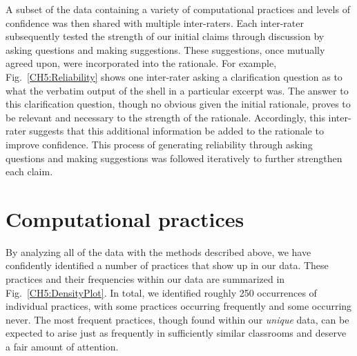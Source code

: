 \documentclass{msuphddissertation}
\begin{document}
\begin{doublespace}
A subset of the data containing a variety of computational practices and levels of confidence was then shared with multiple inter-raters.  Each inter-rater subsequently tested the strength of our initial claims through discussion by asking questions and making suggestions.  These suggestions, once mutually agreed upon, were incorporated into the rationale.  For example, Fig.~\ref{CH5:Reliability} shows one inter-rater asking a clarification question as to what the verbatim output of the shell in a particular excerpt was.  The answer to this clarification question, though no obvious given the initial rationale, proves to be relevant and necessary to the strength of the rationale.  Accordingly, this inter-rater suggests that this additional information be added to the rationale to improve confidence.  This process of generating reliability through asking questions and making suggestions was followed iteratively to further strengthen each claim.

\section{Computational practices}\label{CH5:Practices}

By analyzing all of the data with the methods described above, we have confidently identified a number of practices that show up in our data.  These practices and their frequencies within our data are summarized in Fig.~\ref{CH5:DensityPlot}.  In total, we identified roughly 250 occurrences of individual practices, with some practices occurring frequently and some occurring never.  The most frequent practices, though found within our \textit{unique} data, can be expected to arise just as frequently in sufficiently similar classrooms and deserve a fair amount of attention.


\end{doublespace}
\end{document}
